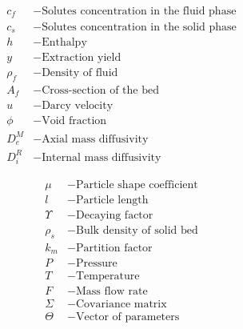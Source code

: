 \documentclass[a0,portrait]{a0poster}
\begin{document}
\begin{multicols}{2}
\begin{tcolorbox}[width=\linewidth, boxrule=0mm, sharp corners=all, colback=white]
\begin{minipage}[h!]{0.33\linewidth}
	\begin{align*}
		c_f &- \text{Solutes concentration in the fluid phase}\\
		c_s &- \text{Solutes concentration in the solid phase}\\
		h~  &- \text{Enthalpy}\\
		y~ &- \text{Extraction yield}\\
		\rho_f &- \text{Density of fluid}\\
		A_f &- \text{Cross-section of the bed}\\
		u~~ &- \text{Darcy velocity}\\
		\phi~~ &- \text{Void fraction}\\
		D_e^M &- \text{Axial mass diffusivity}\\
		D_i^R &- \text{Internal mass diffusivity}
	\end{align*}
\end{minipage}
%
\begin{minipage}[h!]{0.33\linewidth}
	\begin{align*}
		\mu~ &- \text{Particle shape coefficient}\\
		l~ &- \text{Particle length}\\
		\Upsilon~ &- \text{Decaying factor}\\
		\rho_s &- \text{Bulk density of solid bed}\\
		k_m &- \text{Partition factor}\\
		P~ &- \text{Pressure}\\
		T~ &- \text{Temperature}\\
		F~ &- \text{Mass flow rate} \\
		\Sigma~ &- \text{Covariance matrix} \\
		\Theta~ &- \text{Vector of parameters}
	\end{align*}
\end{minipage}


\end{tcolorbox}
\end{multicols}
\end{document}
